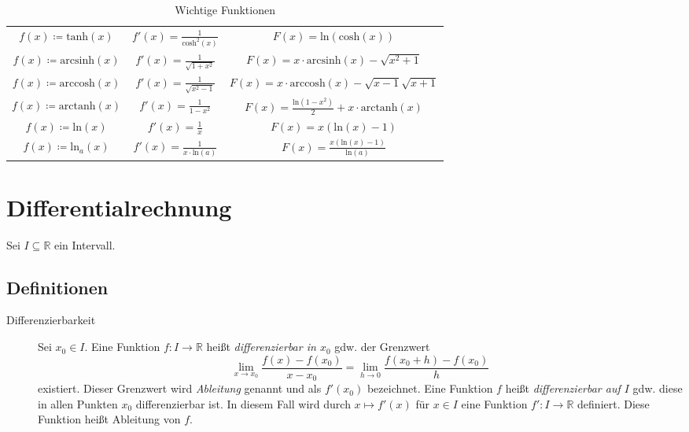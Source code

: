 \begin{table}[ht]
\begin{tabular}{| c | c | c |}
                $ f(x) \coloneqq \text{tanh}(x) $ & $ f'(x) = \frac{1}{\text{cosh} ^ 2 (x)} $ & $ F(x) = \text{ln}(\text{cosh}(x)) $ \\
                $ f(x) \coloneqq \text{arcsinh}(x) $ & $ f'(x) = \frac{1}{\sqrt{1 + x ^ 2}} $ & $ F(x) = x \cdot \text{arcsinh}(x) - \sqrt{x ^ 2 + 1} $ \\
                $ f(x) \coloneqq \text{arccosh}(x) $ & $ f'(x) = \frac{1}{\sqrt{x ^ 2 - 1}} $ & $ F(x) = x \cdot \text{arccosh}(x) - \sqrt{x - 1} \sqrt{x + 1} $ \\
                $ f(x) \coloneqq \text{arctanh}(x) $ & $ f'(x) = \frac{1}{1 - x ^ 2} $ & $ F(x) = \frac{\text{ln}(1 - x ^ 2)}{2} + x \cdot \text{arctanh}(x) $ \\
                $ f(x) \coloneqq \text{ln}(x) $ & $ f'(x) = \frac{1}{x} $ & $ F(x) = x (\text{ln}(x) - 1) $ \\
                $ f(x) \coloneqq \text{ln} _ a (x) $ & $ f'(x) = \frac{1}{x \cdot \text{ln}(a)} $ & $ F(x) = \frac{x (\text{ln}(x) - 1)}{\text{ln}(a)} $ \\
                \hline
            \end{tabular}
            \caption{Wichtige Funktionen}
        \end{table}

\chapter{Differentialrechnung}
    Sei $ I \subseteq \mathbb{R} $ ein Intervall.

    \section{Definitionen}
        \begin{description}
            \item[Differenzierbarkeit] Sei $ x _ 0 \in I $. Eine Funktion $ f : I \rightarrow \mathbb{R} $ heißt \textit{differenzierbar in $ x _ 0 $} gdw. der Grenzwert \[ \lim _ { x \rightarrow x _ 0 } \frac{f(x) - f(x _ 0)}{x - x _ 0} = \lim _ { h \rightarrow 0 } \frac{f(x _ 0 + h) - f(x _ 0)}{h} \] existiert. Dieser Grenzwert wird \textit{Ableitung} genannt und als $ f'(x _ 0) $ bezeichnet. Eine Funktion $ f $ heißt \textit{differenzierbar auf $ I $} gdw. diese in allen Punkten $ x _ 0 $ differenzierbar ist. In diesem Fall wird durch $ x \mapsto f'(x) $ für $ x \in I $ eine Funktion $ f' : I \rightarrow \mathbb{R} $ definiert. Diese Funktion heißt Ableitung von $ f $.
        \end{description}

